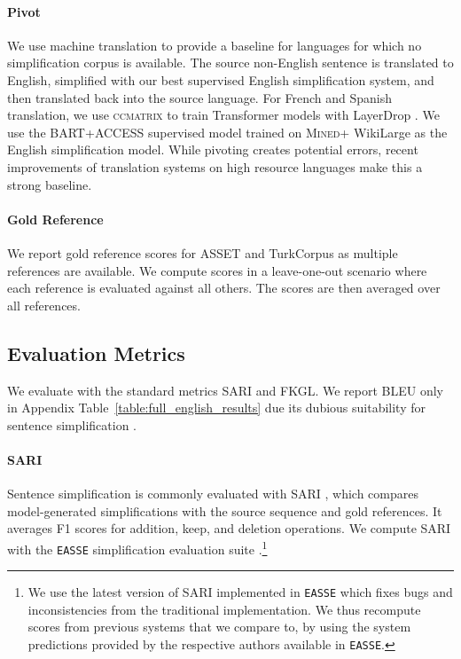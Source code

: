 \documentclass[11pt]{article}
\newcommand{\wikilarge}{WikiLarge\xspace}
\newcommand{\asset}{ASSET\xspace}
\newcommand{\turkcorpus}{TurkCorpus\xspace}
\newcommand{\bartaccess}{\textsc{BART}+\textsc{ACCESS}\xspace}
\newcommand{\mined}{\textsc{Mined}\xspace}
\begin{document}
\paragraph{Pivot} We use machine translation to provide a baseline for languages for which no simplification corpus is available. The source non-English sentence is translated to English, simplified with our best supervised English simplification system, and then translated back into the source language. For French and Spanish translation, we use \textsc{ccmatrix} \cite{schwenk2019ccmatrix} to train Transformer models with LayerDrop \cite{fan2019reducing}. We use the \bartaccess supervised model trained on \mined + \wikilarge as the English simplification model.
While pivoting creates potential errors, recent improvements of translation systems on high resource languages make this a strong baseline.

\paragraph{Gold Reference} We report gold reference scores for \asset and \turkcorpus as multiple references are available. We compute scores in a leave-one-out scenario where each reference is evaluated against all others. The scores are then averaged over all references.







\subsection{Evaluation Metrics}

We evaluate with the standard metrics SARI and FKGL. We report BLEU \cite{papineni2002bleu} only in Appendix Table~\ref{table:full_english_results} due its dubious suitability for sentence simplification \cite{sulem2018semantic}.
\paragraph{SARI} Sentence simplification is commonly evaluated with SARI \cite{xu2016optimizing}, which compares model-generated simplifications with the source sequence and gold references. It averages F1 scores for addition, keep, and deletion operations. We compute SARI with the  \texttt{EASSE} simplification evaluation suite \cite{alva2019easse}.\footnote{We use the latest version of SARI implemented in \texttt{EASSE} \cite{alva2019easse} which fixes bugs and inconsistencies from the traditional implementation. We thus recompute scores from previous systems that we compare to, by using the system predictions provided by the respective authors available in \texttt{EASSE}.}
\end{document}
